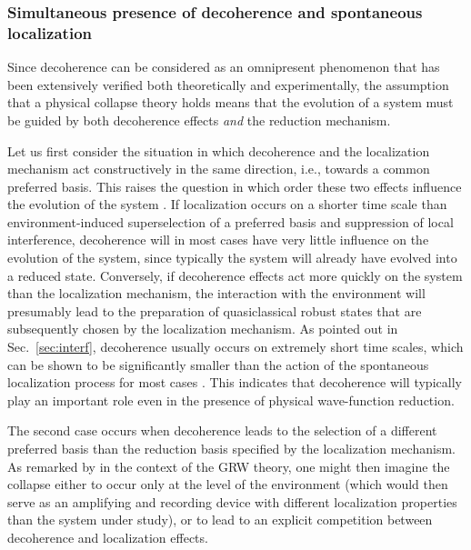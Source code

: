 \documentclass[twocolumn,rmp,aps,amsmath,amsfonts,noshowkeys,noshowpacs]{revtex4}
\begin{document}
\subsubsection{Simultaneous presence of decoherence and spontaneous
  localization}  

Since decoherence can be considered as an omnipresent phenomenon that
has been extensively verified both theoretically and experimentally,
the assumption that a physical collapse theory holds means that the
evolution of a system must be guided by both decoherence effects
\emph{and} the reduction mechanism.

Let us first consider the situation in which decoherence and the
localization mechanism act constructively in the same direction, i.e.,
towards a common preferred basis. This raises the question in which
order these two effects influence the evolution of the system
\citep{Bacciagaluppi:2003:yz}. If localization occurs on a shorter
time scale than environment-induced superselection of a preferred
basis and suppression of local interference, decoherence will in most
cases have very little influence on the evolution of the system, since
typically the system will already have evolved into a reduced state.
Conversely, if decoherence effects act more quickly on the system than
the localization mechanism, the interaction with the environment will
presumably lead to the preparation of quasiclassical robust states
that are subsequently chosen by the localization mechanism. As pointed
out in Sec.~\ref{sec:interf}, decoherence usually occurs on extremely
short time scales, which can be shown to be significantly smaller than
the action of the spontaneous localization process for most cases
\citetext{for studies related to the GRW model, see
  \citealp{Tegmark:1993:uz} and \citealp{Benatti:1995:re}}. This
indicates that decoherence will typically play an important role even
in the presence of physical wave-function reduction.

The second case occurs when decoherence leads to the selection of a
different preferred basis than the reduction basis specified by the
localization mechanism. As remarked by
\citet{Bacciagaluppi:2003:yz,Bacciagaluppi:2003:az} in the context of
the GRW theory, one might then imagine the collapse either to occur
only at the level of the environment (which would then serve as an
amplifying and recording device with different localization properties
than the system under study), or to lead to an explicit competition
between decoherence and localization effects.
\end{document}
